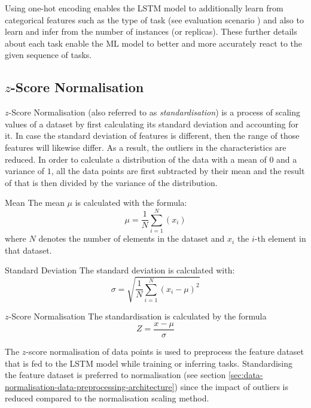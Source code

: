   Using one-hot encoding enables the LSTM model to additionally learn from categorical features such as the type of task (see evaluation scenario ) and also to learn and infer from the number of instances (or  replicas). 
  These further details about each task enable the ML model to better and more accurately react to the given sequence of tasks.

  \subsection{$z$-Score Normalisation}
  \label{sec:data-standardisation-data-preprocessing-architecture}
    $z$-Score Normalisation (also referred to as \emph{standardisation}) is a process of scaling values of a dataset by first calculating its standard deviation and accounting for it. In case the standard deviation of features is different, then the range of those features will likewise differ. As a result, the outliers in the characteristics are reduced.
    In order to calculate a distribution of the data with a mean of $0$ and a variance of $1$, all the data points are first subtracted by their mean and the result of that is then divided by the variance of the distribution.

    \begin{pabox}{Mean}
      \label{def:mean}
      The mean $\mu$ is calculated with the formula:
      $$\mu = \frac{1}{N}\sum_{i = 1}^{N}\left(x_i\right)$$
      where $N$ denotes the number of elements in the dataset and $x_i$ the $i$-th element in that dataset.
    \end{pabox}

    \begin{pabox}{Standard Deviation}
    \label{def:standard-deviation}
      The standard deviation is calculated with:
      $$\sigma = \sqrt{\frac{1}{N} \sum_{i = 1}^{N}\left(x_i - \mu\right)^2}$$
    \end{pabox}

    \begin{pabox}{$z$-Score Normalisation}
    \label{def:standardisation}
      The standardisation is calculated by the formula $$Z = \frac{x - \mu}{\sigma}$$
    \end{pabox}

    The $z$-score normalisation of data points is used to preprocess the feature dataset that is fed to the LSTM model while training or inferring tasks. Standardising the feature dataset is preferred to normalisation (see section \ref{sec:data-normalisation-data-preprocessing-architecture}) since the impact of outliers is reduced compared to the normalisation scaling method.

